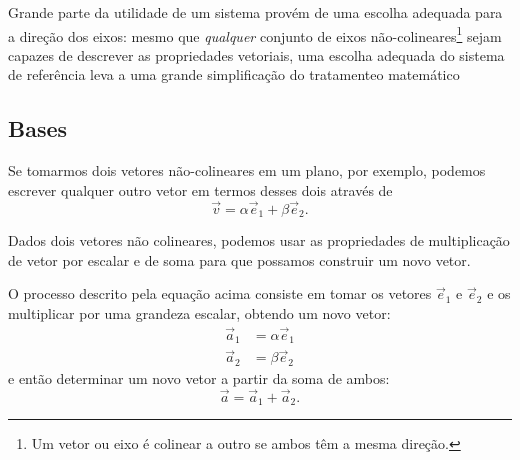Grande parte da utilidade de um sistema provém de uma escolha adequada para a direção dos eixos: mesmo que \emph{qualquer} conjunto de eixos não-colineares\footnote{Um vetor ou eixo é colinear a outro se ambos têm a mesma direção.} sejam capazes de descrever as propriedades vetoriais, uma escolha adequada do sistema de referência leva a uma grande simplificação do tratamenteo matemático

\subsection{Bases}

Se tomarmos dois vetores não-colineares em um plano, por exemplo, podemos escrever qualquer outro vetor em termos desses dois através de
\begin{equation}
  \vec{v} = \alpha \vec{e}_1 + \beta \vec{e}_2.
\end{equation}

\begin{marginfigure}
\centering
{}
\caption{Dados dois vetores não colineares, podemos usar as propriedades de multiplicação de vetor por escalar e de soma para que possamos construir um novo vetor.\label{Fig:VetorObtidoAPartirDeUmaBase}}
\end{marginfigure}

\noindent{}O processo descrito pela equação acima consiste em tomar os vetores $\vec{e}_1$ e $\vec{e}_2$ e os multiplicar por uma grandeza escalar, obtendo um novo vetor:
\begin{align}
    \vec{a}_1 &= \alpha\vec{e}_1 \\
    \vec{a}_2 &= \beta\vec{e}_2
\end{align}
%
e então determinar um novo vetor a partir da soma de ambos:
\begin{equation}
    \vec{a} = \vec{a}_1 + \vec{a}_2.
\end{equation}

